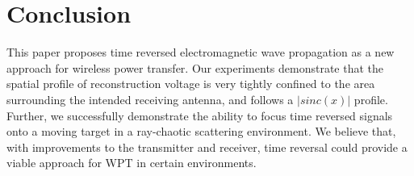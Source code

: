 \section{Conclusion}


This paper proposes time reversed electromagnetic wave propagation as a new
approach for wireless power transfer.
%
Our experiments demonstrate that the spatial profile of reconstruction voltage
is very tightly confined to the area surrounding the intended receiving antenna,
and follows a $\left|sinc(x)\right|$ profile.
%
Further, we successfully demonstrate the ability to focus time reversed signals
onto a moving target in a ray-chaotic scattering environment.
%
We believe that, with improvements to the transmitter and receiver, time reversal
could provide a viable approach for WPT in certain environments.
